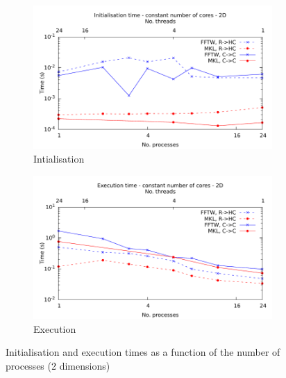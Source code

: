 \documentclass[12pt, a4paper]{article}
\begin{document}
\begin{figure}[H]
\captionsetup{width=0.8\linewidth}
\centering
\begin{subfigure}{.5\textwidth}
\centering
\includegraphics[width=.9\linewidth]{graphs/const-init-2d.pdf}
\caption{Intialisation}
\label{2DCONSTI}
\end{subfigure}%
\begin{subfigure}{.5\textwidth}
\centering
\includegraphics[width=.9\linewidth]{graphs/const-exec-2d.pdf}
\caption{Execution}
\label{2DCONSTE}
\end{subfigure}
\caption{Initialisation and execution times as a function of the number of processes (2 dimensions)}
\label{2DCONST}
\end{figure}
\end{document}
